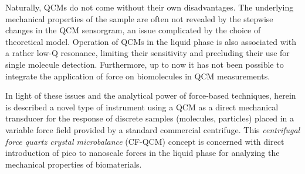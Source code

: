 Naturally, QCMs do not come without their own disadvantages. The underlying
mechanical properties of the sample are often not revealed by the stepwise
changes in the QCM sensorgram, an issue complicated by the choice of
theoretical model.  Operation of QCMs in the liquid phase is also
associated with a rather low-Q resonance, limiting their sensitivity and
precluding their use for single molecule detection.  Furthermore, up to now
it has not been possible to integrate the application of force on
biomolecules in QCM measurements.

In light of these issues and the analytical power of force-based
techniques, herein is described a novel type of instrument using a QCM as a
direct mechanical transducer for the response of discrete samples
(molecules, particles) placed in a variable force field provided by a
standard commercial centrifuge.  This \textit{centrifugal force quartz
crystal microbalance} (CF-QCM) concept is concerned with direct
introduction of pico to nanoscale forces in the liquid phase for analyzing
the mechanical properties of biomaterials.

